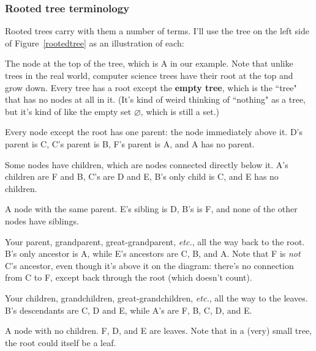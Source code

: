 \subsubsection{Rooted tree terminology}

Rooted trees carry with them a number of terms. I'll use the tree on the
left side of Figure~\ref{rootedtree} as an illustration of each:

\begin{description}
\item[root.] The node at the top of the tree, which is A in our example.
Note that unlike trees in the real world, computer science trees have their
root at the top and grow down. Every tree has a root except the
\textbf{empty tree}, which is the ``tree" that has no nodes at all in it.
(It's kind of weird thinking of ``nothing" as a tree, but it's kind of like
the empty set $\varnothing$, which is still a set.) 

\item[parent.] Every node except the root has one parent: the node
immediately above it. D's parent is C, C's parent is B, F's parent is A,
and A has no parent.

\item[child.] Some nodes have children, which are nodes connected directly
below it. A's children are F and B, C's are D and E, B's only child is C,
and E has no children.

\item[sibling.] A node with the same parent. E's sibling is D, B's is F,
and none of the other nodes have siblings.

\item[ancestor.] Your parent, grandparent, great-grandparent,
\textit{etc.}, all the way back to the root. B's only ancestor is A, while
E's ancestors are C, B, and A. Note that F is \textit{not} C's ancestor,
even though it's above it on the diagram: there's no connection from C to
F, except back through the root (which doesn't count).

\item[descendant.] Your children, grandchildren, great-grandchildren,
\textit{etc.}, all the way to the leaves. B's descendants are C, D and E,
while A's are F, B, C, D, and E. 

\item[leaf.] A node with no children. F, D, and E are leaves. Note that in
a (very) small tree, the root could itself be a leaf.


\end{description}
